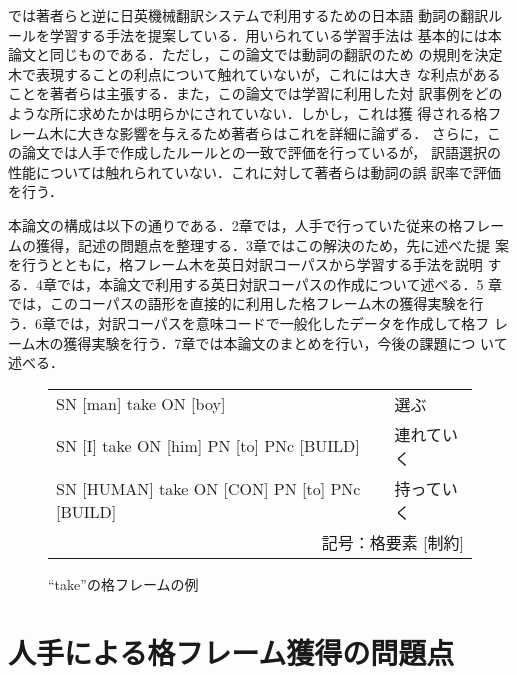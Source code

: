 \cite{Alm94}では著者らと逆に日英機械翻訳システムで利用するための日本語
動詞の翻訳ルールを学習する手法を提案している．用いられている学習手法は
基本的には本論文と同じものである．ただし，この論文では動詞の翻訳のため
の規則を決定木で表現することの利点について触れていないが，これには大き
な利点があることを著者らは主張する．また，この論文では学習に利用した対
訳事例をどのような所に求めたかは明らかにされていない．しかし，これは獲
得される格フレーム木に大きな影響を与えるため著者らはこれを詳細に論ずる．
さらに，この論文では人手で作成したルールとの一致で評価を行っているが，
訳語選択の性能については触れられていない．これに対して著者らは動詞の誤
訳率で評価を行う．

本論文の構成は以下の通りである．2章では，人手で行っていた従来の格フレー
ムの獲得，記述の問題点を整理する．3章ではこの解決のため，先に述べた提
案を行うとともに，格フレーム木を英日対訳コーパスから学習する手法を説明
する．4章では，本論文で利用する英日対訳コーパスの作成について述べる．5
章では，このコーパスの語形を直接的に利用した格フレーム木の獲得実験を行
う．6章では，対訳コーパスを意味コードで一般化したデータを作成して格フ
レーム木の獲得実験を行う．7章では本論文のまとめを行い，今後の課題につ
いて述べる．

\begin{figure}
  \begin{center}
    \begin{tabular}{|ll|}
      \hline
      SN [man] take ON [boy]& 選ぶ\\
      SN [I] take ON [him] PN [to] PNc [BUILD]& 連れていく\\
      SN [HUMAN] take ON [CON] PN [to] PNc [BUILD]& 持っていく\\
      \hline
      \multicolumn{2}{r}{記号：格要素 {[制約]}}\\
      \end{tabular}
      \caption{``take''の格フレームの例}
    \end{center}
\end{figure}

\section{人手による格フレーム獲得の問題点}

